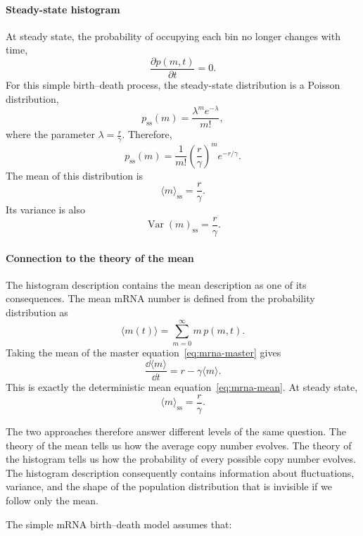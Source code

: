 \paragraph{Steady-state histogram}
At steady state, the probability of occupying each bin no longer changes with time,
\[
    \frac{\partial p(m,t)}{\partial t}=0.
\]
For this simple birth--death process, the steady-state distribution is a Poisson distribution,
\[
    p_{\mathrm{ss}}(m) = \frac{\lambda^m e^{-\lambda}}{m!},
\]
where the parameter $\lambda = \frac{r}{\gamma}$.
Therefore,
\[
    \boxed{ p_{\mathrm{ss}}(m) = \frac{1}{m!} \left(\frac{r}{\gamma}\right)^m e^{-r/\gamma} }.
\]
The mean of this distribution is
\[
    \langle m\rangle_{\mathrm{ss}}=\frac{r}{\gamma}.
\]
Its variance is also
\[
    \operatorname{Var}(m)_{\mathrm{ss}}=\frac{r}{\gamma}.
\]
% 
% 
\paragraph{Connection to the theory of the mean}
The histogram description contains the mean description as one of its consequences.
The mean mRNA number is defined from the probability distribution as
\[
    \langle m(t)\rangle = \sum_{m=0}^{\infty}m\,p(m,t).
\]
Taking the mean of the master equation~\eqref{eq:mrna-master} gives
\[
    \boxed{ \frac{\dd\langle m\rangle}{\dd t} = r-\gamma\langle m\rangle }.
\]
This is exactly the deterministic mean equation~\eqref{eq:mrna-mean}.
At steady state,
\[
    \langle m\rangle_{\mathrm{ss}}=\frac{r}{\gamma}.
\]

The two approaches therefore answer different levels of the same question.
The theory of the mean tells us how the average copy number evolves.
The theory of the histogram tells us how the probability of every possible copy number evolves.
The histogram description consequently contains information about fluctuations, variance, and the shape of the population distribution that is invisible if we follow only the mean.
% 

The simple mRNA birth--death model assumes that:

